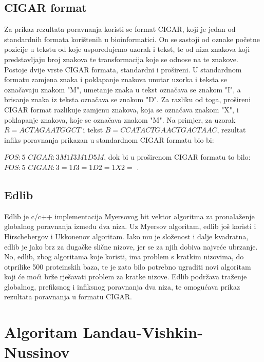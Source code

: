 \documentclass[times, utf8, zavrsni]{fer}
\begin{document}
\section{CIGAR format}\label{sec:cigar}
Za prikaz rezultata poravnanja koristi se format CIGAR, koji je jedan od standardnih formata korištenih u bioinformatici. On se sastoji od oznake početne pozicije u tekstu od koje uspoređujemo uzorak i tekst, te od niza znakova koji predstavljaju broj znakova te transformacija koje se odnose na te znakove. Postoje dvije vrste CIGAR formata, standardni i prošireni. U standardnom formatu zamjena znaka i poklapanje znakova unutar uzorka i teksta se označavaju znakom "M", umetanje znaka u tekst označava se znakom "I", a brisanje znaka iz teksta označava se znakom "D". Za razliku od toga, prošireni CIGAR format razlikuje zamjenu znakova, koja se označava znakom "X", i poklapanje znakova, koje se označava znakom "M". Na primjer, za uzorak $R = ACTAGAATGGCT$ i tekst $B = CCATACTGAACTGACTAAC$, rezultat infiks poravnanja prikazan u standardnom CIGAR formatu bio bi:
\begin{flushleft}
$POS: 5$
\linebreak $CIGAR: 3M1I3M1D5M $,
\linebreak dok bi u proširenom CIGAR formatu to bilo:
\linebreak $POS: 5$
\linebreak $CIGAR: 3{=}1I3{=}1D2{=}1X2{=}$ .
\end{flushleft}

\section{Edlib}
Edlib \citep{edlib} je c/c++ implementacija Myersovog bit vektor algoritma \citep{Myers1999} za pronalaženje globalnog poravnanja između dva niza. Uz Myersov algoritam, edlib još koristi i Hirschebergov \citep{Hirschberg1975} i Ukkonenov \citep{Ukkonen1985} algoritam. Iako mu je složenost i dalje kvadratna, edlib je jako brz za dugačke slične nizove, jer se za njih dobiva najveće ubrzanje. No, edlib, zbog algoritama koje koristi, ima problem s kratkim nizovima, do otprilike 500 proteinskih baza, te je zato bilo potrebno ugraditi novi algoritam koji će moći brže rješavati problem za kratke nizove. Edlib podržava traženje globalnog, prefiksnog i infiksnog poravnanja dva niza, te omogućava prikaz rezultata poravnanja u formatu CIGAR.

\chapter{Algoritam Landau-Vishkin-Nussinov}
\end{document}
